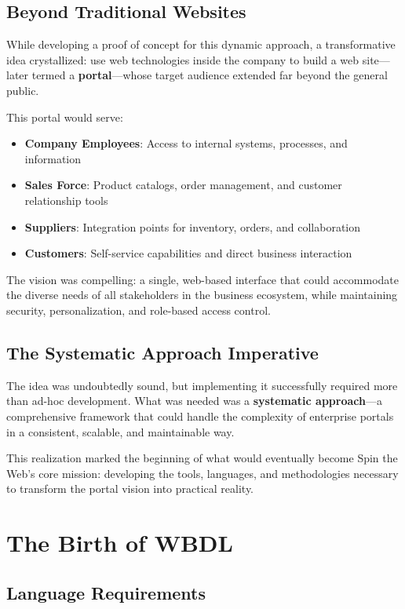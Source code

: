 \subsection{Beyond Traditional Websites}

While developing a proof of concept for this dynamic approach, a transformative idea crystallized: use web technologies inside the company to build a web site—later termed a \textbf{portal}—whose target audience extended far beyond the general public.

This portal would serve:
\begin{itemize}
\item \textbf{Company Employees}: Access to internal systems, processes, and information
\item \textbf{Sales Force}: Product catalogs, order management, and customer relationship tools
\item \textbf{Suppliers}: Integration points for inventory, orders, and collaboration
\item \textbf{Customers}: Self-service capabilities and direct business interaction
\end{itemize}

The vision was compelling: a single, web-based interface that could accommodate the diverse needs of all stakeholders in the business ecosystem, while maintaining security, personalization, and role-based access control.

\subsection{The Systematic Approach Imperative}

The idea was undoubtedly sound, but implementing it successfully required more than ad-hoc development. What was needed was a \textbf{systematic approach}—a comprehensive framework that could handle the complexity of enterprise portals in a consistent, scalable, and maintainable way.

This realization marked the beginning of what would eventually become Spin the Web's core mission: developing the tools, languages, and methodologies necessary to transform the portal vision into practical reality.

\section{The Birth of WBDL}

\subsection{Language Requirements}

